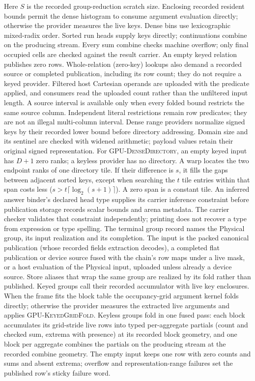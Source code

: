 Here $S$ is the recorded group-reduction scratch size. Enclosing recorded
resident bounds permit the dense histogram to consume argument evaluation
directly; otherwise the provider measures the live keys. Dense bins use
lexicographic mixed-radix order. Sorted run heads supply keys directly;
continuations combine on the producing stream. Every sum combine checks
machine overflow; only final occupied cells are checked against the result
carrier. An empty keyed relation publishes zero rows.
Whole-relation (zero-key) lookups also demand a recorded source or completed
publication, including its row count; they do not require a keyed provider.
Filtered host Cartesian operands are uploaded with the predicate applied,
and consumers read the uploaded count rather than the unfiltered input length.
A source interval is available only when every folded bound restricts the
same source column. Independent literal restrictions remain row predicates;
they are not an illegal multi-column interval. Dense range providers normalize
signed keys by their recorded lower bound before
directory addressing. Domain size and its sentinel are checked with widened
arithmetic; payload values retain their original signed representation.
For \textsc{GPU-DenseDirectory}, an empty keyed input has $D+1$ zero ranks;
a keyless provider has no directory. A warp locates the two endpoint ranks of
one directory tile. If their difference is $s$, it fills the gaps between
adjacent sorted keys, except when searching the $t$ tile entries within that
span costs less ($s>t\lceil\log_2(s+1)\rceil$). A zero span is a constant tile.
An inferred answer binder's declared head type supplies its carrier inference
constraint before publication storage records scalar bounds and arena metadata.
The carrier checker validates that constraint independently; printing does not
recover a type from expression or type spelling.
The terminal group record names the Physical group, its input realization and
its completion. The input is the packed canonical publication (whose recorded
fields extraction decodes), a completed flat publication or device source
fused with the chain's row maps under a live mask, or a host evaluation of the
Physical input, uploaded unless already a device source. Store aliases that
wrap the same group are realized by its fold rather than published. Keyed
groups call their recorded accumulator with live key enclosures. When the
frame fits the block table the occupancy-grid argument kernel folds directly;
otherwise the provider measures the extracted live arguments and applies
\textsc{GPU-KeyedGridFold}. Keyless groups fold in one fused pass: each block accumulates its
grid-stride live rows into typed per-aggregate partials (count and checked sum,
extrema with presence) at its recorded block geometry, and one block per
aggregate combines the partials on the producing stream at the recorded
combine geometry. The empty input keeps one row with zero counts and sums and absent
extrema; overflow and representation-range failures set the published row's
sticky failure word.

